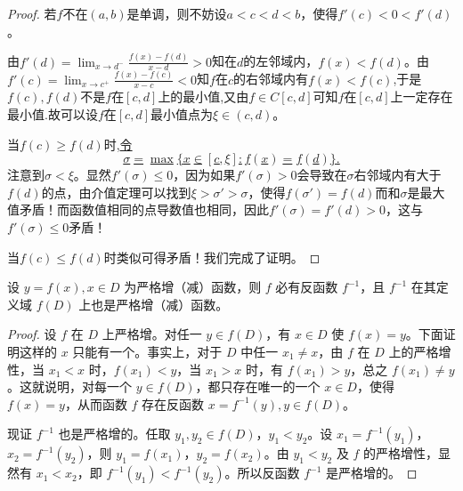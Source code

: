 \documentclass[../../main.tex]{subfiles}%
\begin{document}
\begin{proof}
若\(f\)不在\((a,b)\)是单调，则不妨设\(a < c < d < b\)，使得\(f'(c)<0<f'(d)\)。

由\(f'(d)=\lim_{x\rightarrow d^{-}}\frac{f(x)-f(d)}{x - d}>0\)知在\(d\)的左邻域内，\(f(x)<f(d)\)。由\(f'(c)=\lim_{x\rightarrow c^{+}}\frac{f(x)-f(c)}{x - c}<0\)知\(f\)在\(c\)的右邻域内有\(f(x)<f(c)\),于是$f(c),f(d)$不是$f$在$[c,d]$上的最小值,又由$f\in C[c,d]$可知$f$在$[c,d]$上一定存在最小值.故可以设\(f\)在\([c,d]\)最小值点为\(\xi\in(c,d)\)。

当\(f(c)\geqslant f(d)\)时,\hyperlink{令
sigma=max{x in[c,xi]:f(x)=f(d)}的原因
}{令
\[
\sigma=\max\{x\in[c,\xi]:f(x)=f(d)\}.
\]}
注意到\(\sigma<\xi\)。显然\(f'(\sigma)\leqslant0\)，因为如果\(f'(\sigma)>0\)会导致在\(\sigma\)右邻域内有大于\(f(d)\)的点，由介值定理可以找到\(\xi>\sigma'>\sigma\)，使得\(f(\sigma')=f(d)\)而和\(\sigma\)是最大值矛盾！而函数值相同的点导数值也相同，因此\(f'(\sigma)=f'(d)>0\)，这与\(f'(\sigma)\leqslant0\)矛盾！

当\(f(c)\leqslant f(d)\)时类似可得矛盾！我们完成了证明。
\end{proof}


\begin{theorem}[反函数存在定理]\label{theorem:反函数存在定理}
设 \( y = f(x), x \in D \) 为严格增（减）函数，则 \( f \) 必有反函数 \( f^{-1} \)，且 \( f^{-1} \) 在其定义域 \( f(D) \) 上也是严格增（减）函数。
\end{theorem}
\begin{proof}
设 \( f \) 在 \( D \) 上严格增。对任一 \( y \in f(D) \)，有 \( x \in D \) 使 \( f(x) = y \)。下面证明这样的 \( x \) 只能有一个。事实上，对于 \( D \) 中任一 \( x_1 \neq x \)，由 \( f \) 在 \( D \) 上的严格增性，当 \( x_1 < x \) 时，\( f(x_1) < y \)，当 \( x_1 > x \) 时，有 \( f(x_1) > y \)，总之 \( f(x_1) \neq y \)。这就说明，对每一个 \( y \in f(D) \)，都只存在唯一的一个 \( x \in D \)，使得 \( f(x) = y \)，从而函数 \( f \) 存在反函数 \( x = f^{-1}(y), y \in f(D) \)。

现证 \( f^{-1} \) 也是严格增的。任取 \( y_1, y_2 \in f(D) \)，\( y_1 < y_2 \)。设 \( x_1 = f^{-1}(y_1) \)，\( x_2 = f^{-1}(y_2) \)，则 \( y_1 = f(x_1) \)，\( y_2 = f(x_2) \)。由 \( y_1 < y_2 \) 及 \( f \) 的严格增性，显然有 \( x_1 < x_2 \)，即 \( f^{-1}(y_1) < f^{-1}(y_2) \)。所以反函数 \( f^{-1} \) 是严格增的。
\end{proof}
\end{document}
